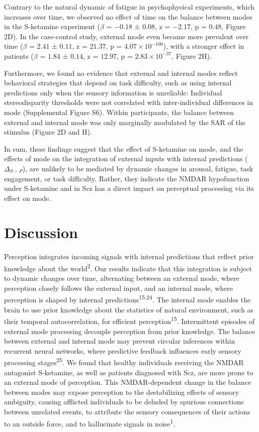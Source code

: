 \documentclass[
]{article}
\begin{document}
Contrary to the natural dynamic of fatigue in psychophysical
experiments, which increases over time, we observed no effect of time on
the balance between modes in the S-ketamine experiment (\(\beta\) =
\(-0.18\) ± \(0.08\), z = \(-2.17\), p = \(0.48\), Figure 2D). In the
case-control study, external mode even became more prevalent over time
(\(\beta\) = \(2.41\) ± \(0.11\), z = \(21.37\), p =
\(\ensuremath{4.07\times 10^{-100}}\)), with a stronger effect in
patients (\(\beta\) = \(1.84\) ± \(0.14\), z = \(12.97\), p =
\(\ensuremath{2.83\times 10^{-37}}\), Figure 2H).

Furthermore, we found no evidence that external and internal modes
reflect behavioral strategies that depend on task difficulty, such as
using internal predictions only when the sensory information is
unreliable: Individual stereodisparity thresholds were not correlated
with inter-individual differences in mode (Supplemental Figure S6).
Within participants, the balance between external and internal mode was
only marginally modulated by the SAR of the stimulus (Figure 2D and H).

In sum, these findings suggest that the effect of S-ketamine on mode,
and the effects of mode on the integration of external inputs with
internal predictions (\(\Delta_{S-P}\)), are unlikely to be mediated by
dynamic changes in arousal, fatigue, task engagement, or task
difficulty. Rather, they indicate the NMDAR hypofunction under
S-ketamine and in Scz has a direct impact on perceptual processing via
its effect on mode.

\section{Discussion}\label{discussion}

Perception integrates incoming signals with internal predictions that
reflect prior knowledge about the world\textsuperscript{2}. Our results
indicate that this integration is subject to dynamic changes over time,
alternating between an external mode, where perception closely follows
the external input, and an internal mode, where perception is shaped by
internal predictions\textsuperscript{15,24}. The internal mode enables
the brain to use prior knowledge about the statistics of natural
environment, such as their temporal autocorrelation, for efficient
perception\textsuperscript{15}. Intermittent episodes of external mode
processing decouple perception from prior knowledge. The balance between
external and internal mode may prevent circular inferences within
recurrent neural networks, where predictive feedback influences early
sensory processing stages\textsuperscript{25}. We found that healthy
individuals receiving the NMDAR antagonist S-ketamine, as well as
patients diagnosed with Scz, are more prone to an external mode of
perception. This NMDAR-dependent change in the balance between modes may
expose perception to the destabilizing effects of sensory ambiguity,
causing afflicted individuals to be deluded by spurious connections
between unrelated events, to attribute the sensory consequences of their
actions to an outside force, and to hallucinate signals in
noise\textsuperscript{1}.
\end{document}
